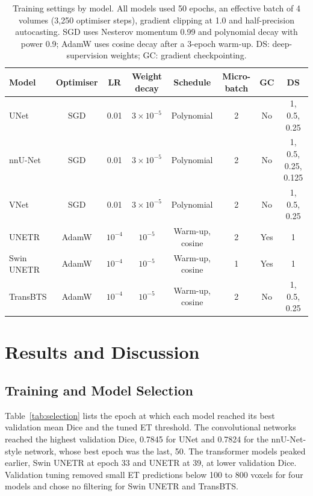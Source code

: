 \documentclass[final,3p,times,number]{elsarticle}
\begin{document}
\begin{table}[htbp]
\centering
\caption{Training settings by model. All models used 50 epochs, an effective batch of 4 volumes (3,250 optimiser steps), gradient clipping at 1.0 and half-precision autocasting. SGD uses Nesterov momentum 0.99 and polynomial decay with power 0.9; AdamW uses cosine decay after a 3-epoch warm-up. DS: deep-supervision weights; GC: gradient checkpointing.}
\label{tab:hyperparameters}
\scriptsize
\begin{tabular*}{\textwidth}{@{\extracolsep{\fill}}lccccccc@{}}
\toprule
Model & Optimiser & LR & Weight decay & Schedule & Micro-batch & GC & DS \\
\midrule
UNet & SGD & 0.01 & $3\times 10^{-5}$ & Polynomial & 2 & No & 1, 0.5, 0.25 \\
nnU-Net & SGD & 0.01 & $3\times 10^{-5}$ & Polynomial & 2 & No & 1, 0.5, 0.25, 0.125 \\
VNet & SGD & 0.01 & $3\times 10^{-5}$ & Polynomial & 2 & No & 1, 0.5, 0.25 \\
UNETR & AdamW & $10^{-4}$ & $10^{-5}$ & Warm-up, cosine & 2 & Yes & 1 \\
Swin UNETR & AdamW & $10^{-4}$ & $10^{-5}$ & Warm-up, cosine & 1 & Yes & 1 \\
TransBTS & AdamW & $10^{-4}$ & $10^{-5}$ & Warm-up, cosine & 2 & No & 1, 0.5, 0.25 \\
\bottomrule
\end{tabular*}
\end{table}

\section{Results and Discussion}

\subsection{Training and Model Selection}

Table~\ref{tab:selection} lists the epoch at which each model reached its best validation mean Dice and the tuned ET threshold. The convolutional networks reached the highest validation Dice, 0.7845 for UNet and 0.7824 for the nnU-Net-style network, whose best epoch was the last, 50. The transformer models peaked earlier, Swin UNETR at epoch 33 and UNETR at 39, at lower validation Dice. Validation tuning removed small ET predictions below 100 to 800 voxels for four models and chose no filtering for Swin UNETR and TransBTS.
\end{document}
